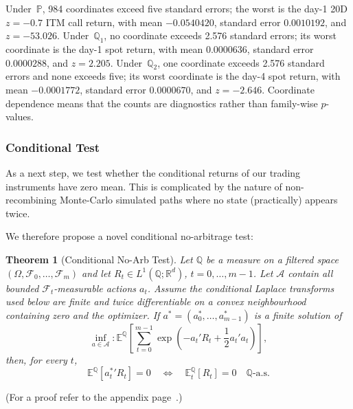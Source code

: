 \documentclass[11pt,a4paper]{article}
\newtheorem{theorem}[definition]{Theorem}
\newcommand{\R}{\mathbb{R}}
\newcommand{\E}{\mathbb{E}}
\newcommand{\Q}{\mathbb{Q}}
\renewcommand{\P}{\mathbb{P}}
\renewcommand{\Q}{\mathbb{Q}}
\begin{document}
Under~$\P$, 984 coordinates exceed five standard errors; the worst is the
day-1 20D $z=-0.7$ ITM call return, with mean $-0.0540420$, standard error
$0.0010192$, and $z=-53.026$.  Under~$\Q_1$, no coordinate exceeds 2.576
standard errors; its worst coordinate is the day-1 spot return, with mean
$0.0000636$, standard error $0.0000288$, and $z=2.205$.  Under~$\Q_2$, one
coordinate exceeds 2.576 standard errors and
none exceeds five; its worst coordinate is the day-4 spot return, with mean
$-0.0001772$, standard error $0.0000670$, and $z=-2.646$.  Coordinate
dependence means that the counts are diagnostics rather than family-wise
$p$-values.

\subsubsection{Conditional Test}

As a next step, we test whether the conditional returns of our trading instruments have zero mean.
This is complicated by the nature of non-recombining Monte-Carlo simulated paths where no state (practically) appears twice.

We therefore propose a novel conditional no-arbitrage test:

\begin{theorem}[Conditional No-Arb Test]\label{th:cond-no-arb}
Let $\Q$ be a measure on a filtered space
$(\Omega,\mathcal{F}_0,\ldots,\mathcal{F}_m)$ and let
$R_t\in L^1(\Q;\R^d)$, $t=0,\ldots,m-1$.  Let $\mathcal A$ contain all bounded
$\mathcal F_t$-measurable actions $a_t$.  Assume the conditional Laplace
transforms used below are finite and twice differentiable on a convex
neighbourhood containing zero and the optimizer.  If
$a^*=(a_0^*,\ldots,a_{m-1}^*)$ is a finite solution of
\begin{equation}
  \inf_{a\in\mathcal A}: \E^\Q\!\left[
    \sum_{t=0}^{m-1}
    \exp\!\left(-a_t'R_t+\frac12a_t'a_t\right)
  \right],
  \label{eq:population-action-objective}
\end{equation}
then, for every $t$,
\begin{equation}
  \E^\Q[{a_t^*}'R_t]=0
  \quad\Longleftrightarrow\quad
  \E_t^\Q[R_t]=0\quad\Q\text{-a.s.}
  \label{eq:population-action-equivalence}
\end{equation}
\end{theorem}
\noindent
(For a proof refer to the appendix page~\pageref{sec:proof-cond-no-arb}.)
\end{document}
